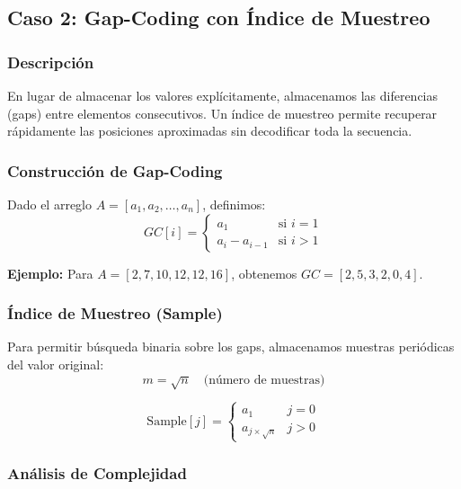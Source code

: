 \documentclass[11pt, twocolumn]{article}
\begin{document}
\subsection{Caso 2: Gap-Coding con Índice de Muestreo}

\subsubsection{Descripción}

En lugar de almacenar los valores explícitamente, almacenamos las diferencias (gaps) entre elementos consecutivos. Un índice de muestreo permite recuperar rápidamente las posiciones aproximadas sin decodificar toda la secuencia.

\subsubsection{Construcción de Gap-Coding}

Dado el arreglo $A = [a_1, a_2, \ldots, a_n]$, definimos:
\begin{equation}
GC[i] = \begin{cases}
a_1 & \text{si } i = 1 \\
a_i - a_{i-1} & \text{si } i > 1
\end{cases}
\end{equation}

\textbf{Ejemplo:} Para $A = [2, 7, 10, 12, 12, 16]$, obtenemos $GC = [2, 5, 3, 2, 0, 4]$.

\subsubsection{Índice de Muestreo (Sample)}

Para permitir búsqueda binaria sobre los gaps, almacenamos muestras periódicas del valor original:
\begin{equation}
m = \sqrt{n} \quad \text{(número de muestras)}
\end{equation}

\begin{equation}
\text{Sample}[j] = \begin{cases}
a_1 & j = 0 \\
a_{j \times \sqrt{n}} & j > 0
\end{cases}
\end{equation}

\subsubsection{Análisis de Complejidad}
\end{document}

